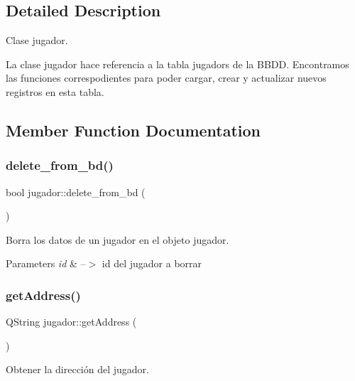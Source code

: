 \subsection{Detailed Description}
Clase jugador. 

La clase jugador hace referencia a la tabla \textquotesingle{}jugadors\textquotesingle{} de la B\+B\+DD. Encontramos las funciones correspodientes para poder cargar, crear y actualizar nuevos registros en esta tabla. 

\subsection{Member Function Documentation}
\mbox{\label{classjugador_acd83799dcfbff2b813eb6c674ae8e5b2}} 
\subsubsection{\texorpdfstring{delete\+\_\+from\+\_\+bd()}{delete\_from\_bd()}}
{\footnotesize\ttfamily bool jugador\+::delete\+\_\+from\+\_\+bd (\begin{DoxyParamCaption}{ }\end{DoxyParamCaption})}



Borra los datos de un jugador en el objeto jugador. 


\begin{DoxyParams}{Parameters}
{\em id} & --$>$ id del jugador a borrar \\
\hline
\end{DoxyParams}
\mbox{\label{classjugador_adb7342524d07d6708414942a82cfa514}} 
\subsubsection{\texorpdfstring{get\+Address()}{getAddress()}}
{\footnotesize\ttfamily Q\+String jugador\+::get\+Address (\begin{DoxyParamCaption}{ }\end{DoxyParamCaption})}



Obtener la dirección del jugador. 

